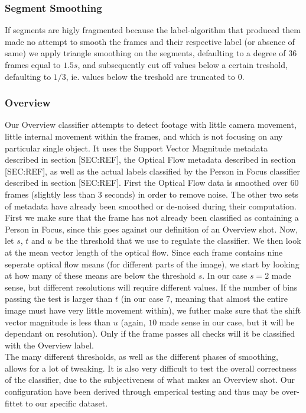 \subsubsection{Segment Smoothing}\label{sec:labelsmooth}
%
If segments are higly fragmented because the label-algorithm that produced them made no attempt to smooth the frames and their respective label (or absence of same) we apply triangle smoothing on the segments, defaulting to a degree of $36$ frames equal to $1.5s$, and subsequently cut off values below a certain treshold, defaulting to $1/3$, ie. values below the treshold are truncated to $0$.
%
\subsubsection{Overview}
%
%
%
Our Overview classifier attempts to detect footage with little camera movement, little internal movement within the frames, and which is not focusing on any particular single object.
%
%
It uses the Support Vector Magnitude metadata described in section [SEC:REF], the Optical Flow metadata described in section [SEC:REF], as well as the actual labels classified by the Person in Focus classifier described in section [SEC:REF]. First the Optical Flow data is smoothed over 60 frames (slightly less than 3 seconds) in order to remove noise. The other two sets of metadata have already been smoothed or de-noised during their computation.\\
%
%
First we make sure that the frame has not already been classified as containing a Person in Focus, since this goes against our definition of an Overview shot. Now, let $s$, $t$ and $u$ be the threshold that we use to regulate the classifier. We then look at the mean vector length of the optical flow. Since each frame contains nine seperate optical flow means (for different parts of the image), we start by looking at how many of these means are below the threshold $s$. In our case $s=2$ made sense, but different resolutions will require different values. If the number of bins passing the test is larger than $t$ (in our case $7$, meaning that almost the entire image must have very little movement within), we futher make sure that the shift vector magnitude is less than $u$ (again, $10$ made sense in our case, but it will be dependant on resolution).
%
%
Only if the frame passes all checks will it be classified with the Overview label.\\
The many different thresholds, as well as the different phases of smoothing, allows for a lot of tweaking. It is also very difficult to test the overall correctness of the classifier, due to the subjectiveness of what makes an Overview shot. Our configuration have been derived through emperical testing and thus may be over-fittet to our specific dataset.
%
